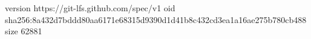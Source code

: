 version https://git-lfs.github.com/spec/v1
oid sha256:8a432d7bddd80aa6171e68315d9390d1d41b8c432cd3ea1a16ae275b780cb488
size 62881
